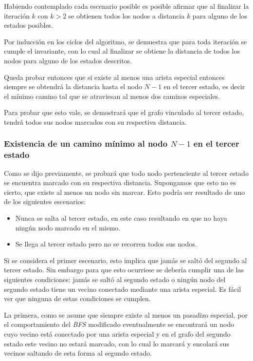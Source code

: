 	Habiendo contemplado cada escenario posible es posible afirmar que al
	finalizar la iteración $k$ con $k > 2$ se obtienen todos los nodos a
	distancia $k$ para alguno de los estados posibles.

	Por inducción en los ciclos del algoritmo, se demuestra que para
	toda iteración se cumple el invariante, con lo cual al finalizar se obtiene
	la distancia de todos los nodos para alguno de los estados descritos.

	Queda probar entonces que si existe al menos una arista especial entonces
	siempre se obtendrá la distancia hasta el nodo $N - 1$ en el tercer estado,
	es decir el mínimo camino tal que se atraviesan al menos dos caminos
	especiales.

	Para probar que esto vale, se demostrará que el grafo vinculado al tercer
	estado, tendrá todos sus nodos marcados con su respectiva distancia.

	\subsubsection*{Existencia de un camino mínimo al nodo $N - 1$ en el tercer
	estado}

	Como se dijo previamente, se probará que todo nodo pertenciente al tercer
	estado se encuentra marcado con su respectiva distancia. Supongamos que esto
	no es cierto, que existe al menos un nodo sin marcar. Esto podría ser
	resultado de uno de los siguientes escenarios:

	\begin{itemize}
		\item{Nunca se salta al tercer estado, en este caso resultando en que no
			haya ningún nodo marcado en el mismo.}
		\item{Se llega al tercer estado pero no se recorren todos sus nodos.}
	\end{itemize}

	Si se considera el primer escenario, esto implica que jamás se saltó del
	segundo al tercer estado. Sin embargo para que esto ocurriese se debería
	cumplir una de las siguientes condiciones: jamás se saltó al segundo estado
	o ningún nodo del segundo estado tiene un vecino conectado mediante una
	arista especial. Es fácil ver que ninguna de estas condiciones se cumplen.

	La primera, como se asume que siempre existe al menos un pasadizo especial,
	por el comportamiento del \emph{BFS} modificado eventualmente se
	encontrará un nodo cuyo vecino está conectado por una arista especial y en el
	grafo del segundo estado este vecino no estará marcado, con lo cual lo
	marcará y encolará sus vecinos saltando de esta forma al segundo estado.

